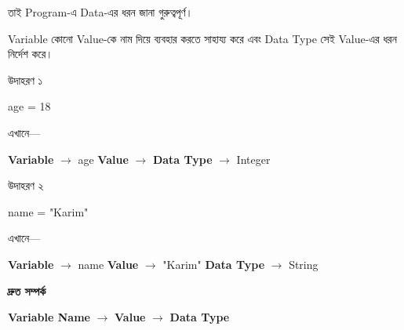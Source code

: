 তাই Program-এ Data-এর ধরন জানা গুরুত্বপূর্ণ।



Variable কোনো Value-কে নাম দিয়ে ব্যবহার করতে সাহায্য করে এবং
Data Type সেই Value-এর ধরন নির্দেশ করে।

\begin{examplebox}{উদাহরণ ১}

\begin{codebox}

\begin{english}
\ttfamily
age = 18
\end{english}

\end{codebox}

এখানে—

\begin{center}

\textbf{Variable}
\(\longrightarrow\)
\textenglish{\ttfamily age}
\qquad
\textbf{Value}
\(\longrightarrow\)
\textenglish{}
\qquad
\textbf{Data Type}
\(\longrightarrow\)
Integer

\end{center}

\end{examplebox}

\begin{examplebox}{উদাহরণ ২}

\begin{codebox}

\begin{english}
\ttfamily
name = "Karim"
\end{english}

\end{codebox}

এখানে—

\begin{center}

\textbf{Variable}
\(\longrightarrow\)
\textenglish{\ttfamily name}
\qquad
\textbf{Value}
\(\longrightarrow\)
\textenglish{\ttfamily "Karim"}
\qquad
\textbf{Data Type}
\(\longrightarrow\)
String

\end{center}

\end{examplebox}

\begin{rememberbox}

\textbf{\color{deepOrange}দ্রুত সম্পর্ক}

\begin{center}

\textbf{Variable Name}
\(\longrightarrow\)
\textbf{Value}
\(\longrightarrow\)
\textbf{Data Type}

\end{center}

\end{rememberbox}

